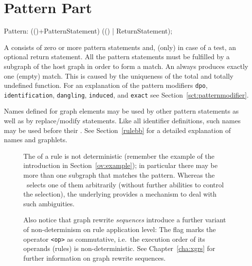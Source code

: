 \section{Pattern Part}
\label{patternpart}
\begin{rail}
  Pattern: (()+PatternStatement) (() | ReturnStatement);
\end{rail}
A  consists of zero or more pattern statements and, (only) in case of a test, an optional return statement.
All the pattern statements must be fulfilled by a subgraph of the host graph in order to form a match.
An  always produces exactly one (empty) match.
This is caused by the uniqueness of the total and totally undefined function.
For an explanation of the pattern modifiers \texttt{dpo}, \texttt{identification}, \texttt{dangling}, \texttt{induced}, and \texttt{exact} see Section~\ref{sct:patternmodifier}.

Names defined for graph elements may be used by other pattern statements as well as by replace/modify statements.
Like all identifier definitions, such names may be used before their .
See Section~\ref{rulebb} for a detailed explanation of names and graphlets.
\begin{figure}[htbp]
\begin{warning}
\label{note:indeterminism}
The  of a rule is not deterministic (remember the example of the introduction in Section~\ref{ov:example}); in particular there may be more than one subgraph that matches the pattern.
Whereas the \GrShell\ selects one of them arbitrarily (without further abilities to control the selection), the underlying \LibGr{} provides a mechanism to deal with such ambiguities.

Also notice that graph rewrite \emph{sequences} introduce a further variant of non-determinism on rule application level:
The  flag marks the operator \texttt{<op>} as commutative, i.e.\ the execution order of its operands (rules) is non-deterministic.
See Chapter~\ref{cha:xgrs} for further information on graph rewrite sequences.
\end{warning}
\end{figure}

